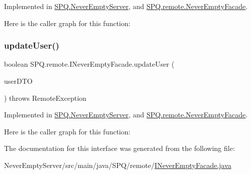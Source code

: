 Implemented in \mbox{\hyperlink{class_s_p_q_1_1_never_empty_server_ae52815c925e04018d6a1b2742d605063}{S\+P\+Q.\+Never\+Empty\+Server}}, and \mbox{\hyperlink{class_s_p_q_1_1remote_1_1_never_empty_facade_a52a0feff1dfb3347e55e46c3ac48fafc}{S\+P\+Q.\+remote.\+Never\+Empty\+Facade}}.

Here is the caller graph for this function\+:
\mbox{\label{interface_s_p_q_1_1remote_1_1_i_never_empty_facade_add6dafb25f59c549e924c76c6e8f31c6}} 
\subsubsection{\texorpdfstring{update\+User()}{updateUser()}}
{\footnotesize\ttfamily boolean S\+P\+Q.\+remote.\+I\+Never\+Empty\+Facade.\+update\+User (\begin{DoxyParamCaption}\item[{\mbox{\hyperlink{class_s_p_q_1_1dto_1_1_user_d_t_o}{User\+D\+TO}}}]{user\+D\+TO }\end{DoxyParamCaption}) throws Remote\+Exception}



Implemented in \mbox{\hyperlink{class_s_p_q_1_1_never_empty_server_ad39f95ea2309841407f7e8b9e1b9f664}{S\+P\+Q.\+Never\+Empty\+Server}}, and \mbox{\hyperlink{class_s_p_q_1_1remote_1_1_never_empty_facade_a55ad685d3c176424a7f5f18e5ebe043b}{S\+P\+Q.\+remote.\+Never\+Empty\+Facade}}.

Here is the caller graph for this function\+:


The documentation for this interface was generated from the following file\+:\begin{DoxyCompactItemize}
\item 
Never\+Empty\+Server/src/main/java/\+S\+P\+Q/remote/\mbox{\hyperlink{_i_never_empty_facade_8java}{I\+Never\+Empty\+Facade.\+java}}\end{DoxyCompactItemize}
